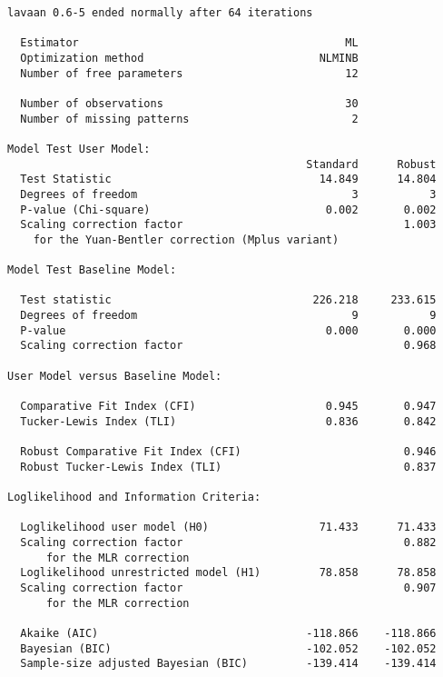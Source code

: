 \begin{verbatim}
lavaan 0.6-5 ended normally after 64 iterations

  Estimator                                         ML
  Optimization method                           NLMINB
  Number of free parameters                         12
                                                      
  Number of observations                            30
  Number of missing patterns                         2
                                                      
Model Test User Model:
                                              Standard      Robust
  Test Statistic                                14.849      14.804
  Degrees of freedom                                 3           3
  P-value (Chi-square)                           0.002       0.002
  Scaling correction factor                                  1.003
    for the Yuan-Bentler correction (Mplus variant) 

Model Test Baseline Model:

  Test statistic                               226.218     233.615
  Degrees of freedom                                 9           9
  P-value                                        0.000       0.000
  Scaling correction factor                                  0.968

User Model versus Baseline Model:

  Comparative Fit Index (CFI)                    0.945       0.947
  Tucker-Lewis Index (TLI)                       0.836       0.842
                                                                  
  Robust Comparative Fit Index (CFI)                         0.946
  Robust Tucker-Lewis Index (TLI)                            0.837

Loglikelihood and Information Criteria:

  Loglikelihood user model (H0)                 71.433      71.433
  Scaling correction factor                                  0.882
      for the MLR correction                                      
  Loglikelihood unrestricted model (H1)         78.858      78.858
  Scaling correction factor                                  0.907
      for the MLR correction                                      
                                                                  
  Akaike (AIC)                                -118.866    -118.866
  Bayesian (BIC)                              -102.052    -102.052
  Sample-size adjusted Bayesian (BIC)         -139.414    -139.414


\end{verbatim}
